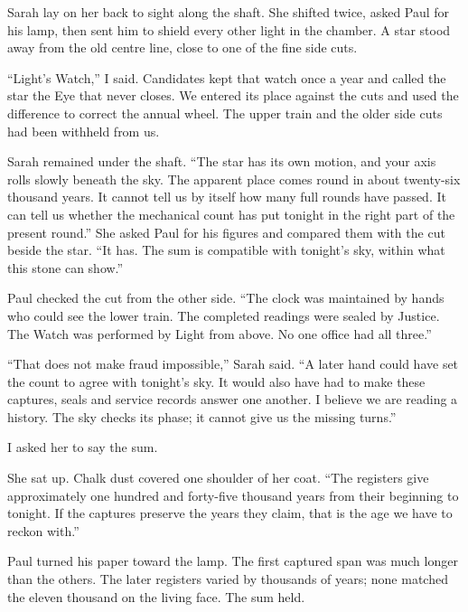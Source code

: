 Sarah lay on her back to sight along the shaft. She shifted twice, asked Paul for his lamp, then sent him to shield every other light in the chamber. A star stood away from the old centre line, close to one of the fine side cuts.\par

``Light's Watch,'' I said. Candidates kept that watch once a year and called the star the Eye that never closes. We entered its place against the cuts and used the difference to correct the annual wheel. The upper train and the older side cuts had been withheld from us.\par

Sarah remained under the shaft. ``The star has its own motion, and your axis rolls slowly beneath the sky. The apparent place comes round in about twenty-six thousand years. It cannot tell us by itself how many full rounds have passed. It can tell us whether the mechanical count has put tonight in the right part of the present round.'' She asked Paul for his figures and compared them with the cut beside the star. ``It has. The sum is compatible with tonight's sky, within what this stone can show.''\par

Paul checked the cut from the other side. ``The clock was maintained by hands who could see the lower train. The completed readings were sealed by Justice. The Watch was performed by Light from above. No one office had all three.''\par

``That does not make fraud impossible,'' Sarah said. ``A later hand could have set the count to agree with tonight's sky. It would also have had to make these captures, seals and service records answer one another. I believe we are reading a history. The sky checks its phase; it cannot give us the missing turns.''\par

I asked her to say the sum.\par

She sat up. Chalk dust covered one shoulder of her coat. ``The registers give approximately one hundred and forty-five thousand years from their beginning to tonight. If the captures preserve the years they claim, that is the age we have to reckon with.''\par

Paul turned his paper toward the lamp. The first captured span was much longer than the others. The later registers varied by thousands of years; none matched the eleven thousand on the living face. The sum held.\par

